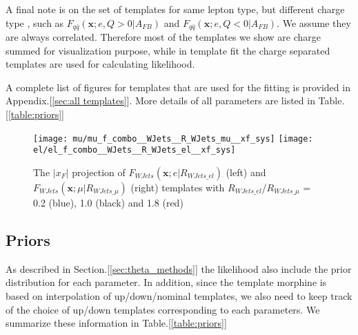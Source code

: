 A final note is on the set of templates for same lepton type, but different charge type , such as $F_{q\bar{q}}(\bm x;e,Q>0|A_{FB})$ and $F_{q\bar{q}}(\bm x;e,Q<0|A_{FB})$. We assume they are always correlated. Therefore most of the templates we show are charge summed for visualization purpose, while in template fit the charge separated templates are used for calculating likelihood.

A complete list of figures for templates that are used for the fitting is provided in Appendix.[\ref{sec:all templates}]. More details of all parameters are listed in Table.[\ref{table:priors}]

\begin{figure}[hbt]
  \begin{center}
    \texttt{[image: mu/mu\_f\_combo\_\_WJets\_\_R\_WJets\_mu\_\_xf\_sys]}
    \texttt{[image: el/el\_f\_combo\_\_WJets\_\_R\_WJets\_el\_\_xf\_sys]}

  \caption{\small The $|x_F|$ projection of $F_{WJets}(\bm x;e|R_{WJets\_el})$ (left) and $F_{WJets}(\bm x;\mu|R_{WJets\_\mu})$ (right) templates with $R_{WJets\_el}$/$R_{WJets\_\mu}$ = 0.2 (blue), 1.0 (black) and 1.8 (red)}
    \label{fig:gg_SF_bkg_templates}
  \end{center}
\end{figure}


\subsection{Priors}
As described in Section.[\ref{sec:theta_methods}] the likelihood also include the prior distribution for each parameter. In addition, since the template morphine is based on interpolation of up/down/nominal templates, we also need to keep track of the choice of up/down templates corresponding to each parameters. We summarize these information in Table.[\ref{table:priors}]

